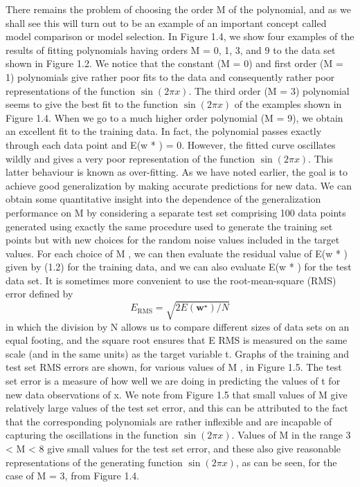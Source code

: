 \documentclass{article} %
\begin{document}
There remains the problem of choosing the order M of the polynomial, and as we shall see this will turn out to be an example of an important concept called model comparison or model selection. In Figure 1.4, we show four examples of the results of fitting polynomials having orders M = 0, 1, 3, and 9 to the data set shown in Figure 1.2. We notice that the constant (M = 0) and first order (M = 1) polynomials give rather poor fits to the data and consequently rather poor representations of the function $\sin(2\pi x)$. The third order (M = 3) polynomial seems to give the best fit to the function $\sin(2\pi x)$ of the examples shown in Figure 1.4. When we go to a much higher order polynomial (M = 9), we obtain an excellent fit to the training data. In fact, the polynomial passes exactly through each data point and E(w * ) = 0. However, the fitted curve oscillates wildly and gives a very poor representation of the function $\sin(2\pi x)$. This latter behaviour is known as over-fitting. As we have noted earlier, the goal is to achieve good generalization by making accurate predictions for new data. We can obtain some quantitative insight into the dependence of the generalization performance on M by considering a separate test set comprising 100 data points generated using exactly the same procedure used to generate the training set points but with new choices for the random noise values included in the target values. For each choice of M , we can then evaluate the residual value of E(w * ) given by (1.2) for the training data, and we can also evaluate E(w * ) for the test data set. It is sometimes more convenient to use the root-mean-square (RMS) error defined by
\begin{equation}
      E_{\mathrm{RMS}}=\sqrt{2 E\left(\mathbf{w}^{\star}\right) / N}
\end{equation}
in which the division by N allows us to compare different sizes of data sets on
an equal footing, and the square root ensures that E RMS is measured on the same
scale (and in the same units) as the target variable t. Graphs of the training and
test set RMS errors are shown, for various values of M , in Figure 1.5. The test
set error is a measure of how well we are doing in predicting the values of t for
new data observations of x. We note from Figure 1.5 that small values of M give
relatively large values of the test set error, and this can be attributed to the fact that
the corresponding polynomials are rather inflexible and are incapable of capturing
the oscillations in the function $\sin(2\pi x)$. Values of M in the range 3 < M < 8
give small values for the test set error, and these also give reasonable representations
of the generating function $\sin(2\pi x)$, as can be seen, for the case of M = 3, from
Figure 1.4.
\end{document}
